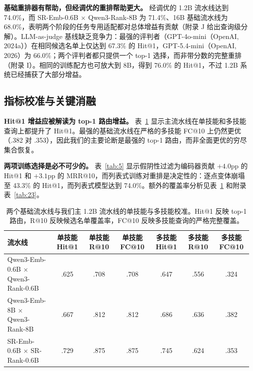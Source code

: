 \documentclass[11pt,UTF8,fontset=fandol]{ctexart}
\makeatletter
\newcommand{\Hit}{Hit@1}
\makeatother
\begin{document}
\textbf{基础重排器有帮助，但经调优的重排帮助更大。} 经调优的 1.2B 流水线达到 74.0\%，而 SR-Emb-0.6B $\times$ Qwen3-Rank-8B 为 71.4\%、16B 基础流水线为 68.0\%，表明两个阶段的任务专用适配都对总体增益有贡献（附录 J 给出查询级分解）。LLM-as-judge 基线缺乏竞争力：最强的评判者（GPT-4o-mini（OpenAI, 2024a））在相同候选名单上仅达到 67.3\% 的 \Hit{}，GPT-5.4-mini（OpenAI, 2026）为 66.0\%；两个评判者都只提供一个 top-1 选择，而非带分数的完整重排（附录 I）。相同的训练配方也可放大到 8B，得到 76.0\% 的 \Hit{}，不过 1.2B 系统已经捕获了大部分增益。

\subsection{指标校准与关键消融}

\textbf{\Hit{} 增益应被解读为 top-1 路由增益。} 表~\ref{tab:4} 显示主流水线在单技能和多技能查询上都提升了 \Hit{}。最强的基础流水线在严格的多技能 FC@10 上仍然更优（.382 对 .353），因此我们的主要论断是最强的 top-1 路由，而非全面更优的穷尽集合恢复。

\textbf{两项训练选择是必不可少的。} 表~\ref{tab:5} 显示假阴性过滤为编码器贡献 $+4.0$pp 的 \Hit{} 和 $+3.1$pp 的 MRR@10，而列表式训练对重排是决定性的：逐点变体崩塌至 43.3\% 的 \Hit{}，而列表式模型达到 74.0\%。额外的覆盖率分析见表~\ref{tab:4} 和附录表~\ref{tab:23}。

\begin{table}[H]\centering
\caption{两个基础流水线与我们主 1.2B 流水线的单技能与多技能校准。\Hit{} 反映 top-1 路由，R@10 反映候选名单覆盖率，FC@10 反映多技能查询的严格完整覆盖。}
\small
\begin{tabular}{lcccccc}
\toprule
流水线 & 单技能 \Hit{} & 单技能 R@10 & 单技能 FC@10 & 多技能 \Hit{} & 多技能 R@10 & 多技能 FC@10 \\ \midrule
Qwen3-Emb-0.6B $\times$ Qwen3-Rank-0.6B & .625 & .708 & .708 & .647 & .556 & .324 \\
Qwen3-Emb-8B $\times$ Qwen3-Rank-8B & .667 & .812 & .812 & .686 & .636 & .382 \\
SR-Emb-0.6B $\times$ SR-Rank-0.6B & .729 & .875 & .875 & .745 & .624 & .353 \\
\bottomrule
\end{tabular}
\label{tab:4}
\end{table}
\end{document}
